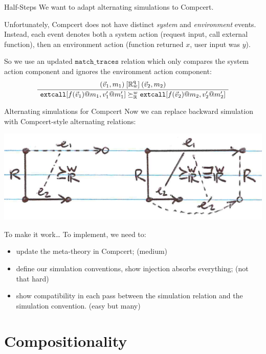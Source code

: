 \documentclass[handout]{beamer}
\newcommand{\kw}[1]{\texttt{#1}}
\begin{document}
\begin{frame}{Half-Steps} %
We want to adapt alternating simulations to Compcert.

Unfortunately,
Compcert does not have distinct \emph{system} and \emph{environment} events.
Instead,
each event denotes both a system action
(request input, call external function),
then an environment action
(function returned $x$, user input was $y$).

So we use an updated $\kw{match\_traces}$ relation
which only compares the system action component and
ignores the environment action component:
\[
  \AxiomC{$
      (\vec{v}_1, m_1) \:[\mathbb{R}^\kw{q}_w]\: (\vec{v}_2, m_2)$}
  \UnaryInfC{$
    \kw{extcall}[f(\vec{v}_1)@m_1, v_1'@m_1']
    \succeq_\mathbb{R}^w
    \kw{extcall}[f(\vec{v}_2)@m_2, v_2'@m_2']$}
  \DisplayProof
\]
\end{frame}

\begin{frame}{Alternating simulations for Compcert} %
Now we can replace backward simulation
with Compcert-style alternating relations:
\begin{center}
  \includegraphics[scale=.65]{figs/altsimc}
\end{center}
\end{frame}

\begin{frame}{To make it work\ldots} %
To implement, we need to:
\begin{itemize}
  \item update the meta-theory in Compcert; (medium)
  \item define our simulation conventions,
    show injection absorbs everything; (not that hard)
  \item show compatibility in each pass between
    the simulation relation and
    the simulation convention. (easy but many)
\end{itemize}
\end{frame}

\section{Compositionality}
\end{document}
